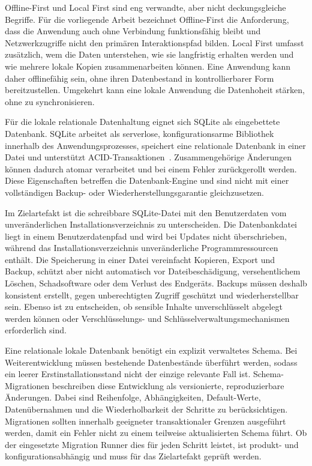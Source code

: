 Offline-First und Local First sind eng verwandte, aber nicht deckungsgleiche Begriffe.
Für die vorliegende Arbeit bezeichnet Offline-First die Anforderung, dass die Anwendung auch ohne Verbindung funktionsfähig bleibt und Netzwerkzugriffe nicht den primären Interaktionspfad bilden.
Local First umfasst zusätzlich, wem die Daten unterstehen, wie sie langfristig erhalten werden und wie mehrere lokale Kopien zusammenarbeiten können.
Eine Anwendung kann daher offlinefähig sein, ohne ihren Datenbestand in kontrollierbarer Form bereitzustellen.
Umgekehrt kann eine lokale Anwendung die Datenhoheit stärken, ohne zu synchronisieren.

Für die lokale relationale Datenhaltung eignet sich SQLite als eingebettete Datenbank.
SQLite arbeitet als serverlose, konfigurationsarme Bibliothek innerhalb des Anwendungsprozesses, speichert eine relationale Datenbank in einer Datei und unterstützt ACID-Transaktionen~\cite{sqlite2025about}.
Zusammengehörige Änderungen können dadurch atomar verarbeitet und bei einem Fehler zurückgerollt werden.
Diese Eigenschaften betreffen die Datenbank-Engine und sind nicht mit einer vollständigen Backup- oder Wiederherstellungsgarantie gleichzusetzen.

Im Zielartefakt ist die schreibbare SQLite-Datei mit den Benutzerdaten vom unveränderlichen Installationsverzeichnis zu unterscheiden.
Die Datenbankdatei liegt in einem Benutzerdatenpfad und wird bei Updates nicht überschrieben, während das Installationsverzeichnis unveränderliche Programmressourcen enthält.
Die Speicherung in einer Datei vereinfacht Kopieren, Export und Backup, schützt aber nicht automatisch vor Dateibeschädigung, versehentlichem Löschen, Schadsoftware oder dem Verlust des Endgeräts.
Backups müssen deshalb konsistent erstellt, gegen unberechtigten Zugriff geschützt und wiederherstellbar sein.
Ebenso ist zu entscheiden, ob sensible Inhalte unverschlüsselt abgelegt werden können oder Verschlüsselungs- und Schlüsselverwaltungsmechanismen erforderlich sind.

Eine relationale lokale Datenbank benötigt ein explizit verwaltetes Schema.
Bei Weiterentwicklung müssen bestehende Datenbestände überführt werden, sodass ein leerer Erstinstallationsstand nicht der einzige relevante Fall ist.
Schema-Migrationen beschreiben diese Entwicklung als versionierte, reproduzierbare Änderungen.
Dabei sind Reihenfolge, Abhängigkeiten, Default-Werte, Datenübernahmen und die Wiederholbarkeit der Schritte zu berücksichtigen.
Migrationen sollten innerhalb geeigneter transaktionaler Grenzen ausgeführt werden, damit ein Fehler nicht zu einem teilweise aktualisierten Schema führt.
Ob der eingesetzte Migration Runner dies für jeden Schritt leistet, ist produkt- und konfigurationsabhängig und muss für das Zielartefakt geprüft werden.

